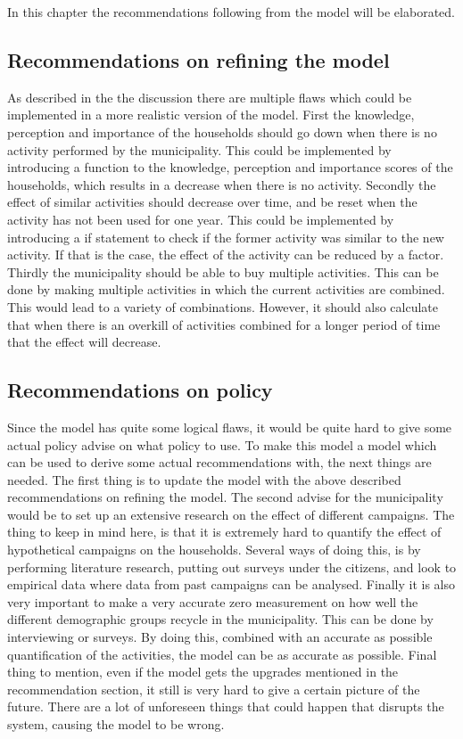 \noindent In this chapter the recommendations following from the model will be elaborated. 

\subsection{Recommendations on refining the model}
\noindent As described in the the discussion there are multiple flaws which could be implemented in a more realistic version of the model. 
\noindent First the knowledge, perception and importance of the households should go down when there is no activity performed by the municipality. This could be implemented by introducing a function to the knowledge, perception and importance scores of the households, which results in a decrease when there is no activity.
\noindent Secondly the effect of similar activities should decrease over time, and be reset when the activity has not been used for one year. This could be implemented by introducing a if statement to check if the former activity was similar to the new activity. If that is the case, the effect of the activity can be reduced by a factor. 
\noindent Thirdly the municipality should be able to buy multiple activities. This can be done by making multiple activities in which the current activities are combined. This would lead to a variety of combinations. However, it should also calculate that when there is an overkill of activities combined for a longer period of time that the effect will decrease. 

\subsection{Recommendations on policy}
\noindent Since the model has quite some logical flaws, it would be quite hard to give some actual policy advise on what policy to use. To make this model a model which can be used to derive some actual recommendations with, the next things are needed.
\noindent The first thing is to update the model with the above described recommendations on refining the model. 
\noindent The second advise for the municipality would be to set up an extensive research on the effect of different campaigns. The thing to keep in mind here, is that it is extremely hard to quantify the effect of hypothetical campaigns on the households. Several ways of doing this, is by performing literature research, putting out surveys under the citizens, and look to empirical data where data from past campaigns can be analysed. 
\noindent Finally it is also very important to make a very accurate zero measurement on how well the different demographic groups recycle in the municipality. This can be done by interviewing or surveys. By doing this, combined with an accurate as possible quantification of the activities, the model can be as accurate as possible. 
\noindent Final thing to mention, even if the model gets the upgrades mentioned in the recommendation section, it still is very hard to give a certain picture of the future. There are a lot of unforeseen things that could happen that disrupts the system, causing the model to be wrong. 
